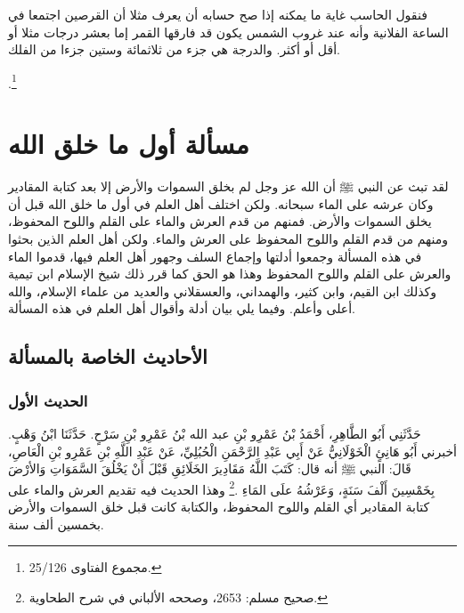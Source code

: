 فنقول الحاسب غاية ما يمكنه إذا صح حسابه أن يعرف مثلا أن القرصين اجتمعا في الساعة الفلانية وأنه عند غروب الشمس يكون قد فارقها القمر إما بعشر درجات مثلا أو أقل أو أكثر. والدرجة هي جزء من ثلاثمائة وستين جزءا من الفلك.

\href{https://shamela.ws/book/7289/12579#p2}{\faExternalLink} \cite{ibnTaimia_Majmoo}.\footnote{مجموع الفتاوى 25/126.} 





\section{مسألة أول ما خلق الله}
\label{sec:app_first_creation}


لقد تبث عن النبي ﷺ أن الله عز وجل لم بخلق السموات والأرض إلا بعد كتابة المقادير وكان عرشه على الماء سبحانه. ولكن اختلف أهل العلم في أول ما خلق الله قبل أن يخلق السموات والأرض. فمنهم من قدم العرش والماء على القلم واللوح المحفوظ، ومنهم من قدم القلم واللوح المحفوظ على العرش والماء. ولكن أهل العلم الذين بحثوا في هذه المسألة وجمعوا أدلتها وإجماع السلف وجهور أهل العلم فيها، قدموا الماء والعرش على القلم واللوح المحفوظ وهذا هو الحق كما قرر ذلك شيخ الإسلام ابن تيمية وكذلك ابن القيم، وابن كثير، والهمداني، والعسقلاني والعديد من علماء الإسلام، والله أعلى وأعلم. وفيما يلي بيان أدلة وأقوال أهل العلم في هذه المسألة.

\subsection{الأحاديث الخاصة بالمسألة}

\subsubsection{الحديث الأول}
\label{sec:app_first_creation_hadith_1}

حَدَّثَنِي أَبُو الطَّاهِرِ، أَحْمَدُ بْنُ عَمْرِو بْنِ عبد الله بْنُ عَمْرِو بْنِ سَرْحٍ. حَدَّثَنَا ابْنُ وَهْبٍ. أخبرني أَبُو هَانِئٍ الْخَوْلَانِيُّ عَنْ أَبِي عَبْدِ الرَّحْمَنِ الْحُبُلِيِّ، عَنْ عَبْدِ اللَّهِ بْنِ عَمْرِو بْنِ الْعَاصِ، قَالَ: النبي ﷺ أنه قال:  كَتَبَ اللَّهُ مَقَادِيرَ الخَلَائِقِ قَبْلَ أَنْ يَخْلُقَ السَّمَوَاتِ وَالأرْضَ بِخَمْسِينَ أَلْفَ سَنَةٍ، وَعَرْشُهُ علَى المَاءِ \href{https://shamela.ws/book/1727/6683#p2}{\faExternalLink} \cite{muslim}.\footnote{صحيح مسلم: 2653، وصححه الألباني في شرح الطحاوية.} وهذا الحديث فيه تقديم العرش والماء على كتابة المقادير أي القلم واللوح المحفوظ، والكتابة كانت قبل خلق السموات والأرض بخمسين ألف سنة.

